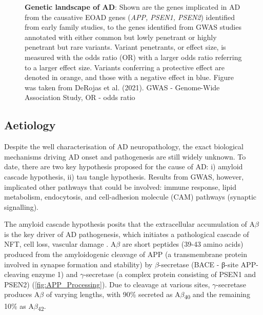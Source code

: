 \begin{landscape}
\begin{figure}[!htp]
		\captionsetup{width=1.6\textwidth,singlelinecheck=off}
		\caption[Genetic landscape of AD]%
		{\textbf{Genetic landscape of AD}: Shown are the genes implicated in AD from the causative EOAD genes (\textit{APP, PSEN1, PSEN2}) identified from early family studies, to the genes identified from GWAS studies annotated with either common but lowly penetrant or highly penetrant but rare variants. Variant penetrants, or effect size, is measured with the odds ratio (OR) with a larger odds ratio referring to a larger effect size. Variants conferring a protective effect are denoted in orange, and those with a negative effect in blue. Figure was taken from DeRojas et al. (2021)\cite{DeRojas2021}. GWAS - Genome-Wide Association Study, OR - odds ratio
		}
		\label{fig:AD_gwas}
	\end{figure}
\end{landscape}

\subsection{Aetiology}
\label{aetiologyAD}
Despite the well characterisation of AD neuropathology, the exact biological mechanisms driving AD onset and pathogenesis are still widely unknown. To date, there are two key hypothesis proposed for the cause of AD: i) amyloid cascade hypothesis, ii) tau tangle hypothesis. Results from GWAS, however, implicated other pathways that could be involved: immune response, lipid metabolism, endocytosis, and cell-adhesion molecule (CAM) pathways (synaptic signalling).  

The amyloid cascade hypothesis posits that the extracellular accumulation of A$\beta$ is the key driver of AD pathogenesis, which initiates a pathological cascade of NFT, cell loss, vascular damage \cite{Hardy1992}. A$\beta$ are short peptides (39-43 amino acids) \cite{J1987} produced from the amyloidogenic cleavage of APP (a transmembrane protein involved in synapse formation and stability) by $\beta$-secretase (BACE - β-site APP-cleaving enzyme 1) and $\gamma$-secretase (a complex protein consisting of PSEN1 and PSEN2) (\cref{fig:APP_Processing}). Due to cleavage at various sites, $\gamma$-secretase produces A$\beta$ of varying lengths, with 90\% secreted as A$\beta$\textsubscript{40} and the remaining 10\% as A$\beta$\textsubscript{42}\cite{Asami-Odaka1995}.

